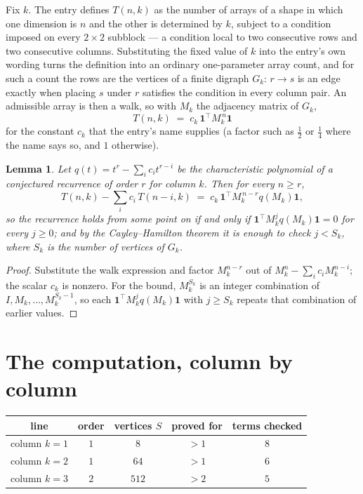 \documentclass[11pt,a4paper]{article}
\theoremstyle{plain}
\newtheorem{lemma}[theorem]{Lemma}
\theoremstyle{definition}
\begin{document}
Fix $k$. The entry defines $T(n,k)$ as the number of arrays of a shape in which one dimension
is $n$ and the other is determined by $k$, subject to a condition imposed on every
$2\times2$ subblock --- a condition local to two consecutive rows and two consecutive columns.
Substituting the fixed value of $k$ into the entry's own wording turns the definition into an
ordinary one-parameter array count, and for such a count the rows are the vertices of a finite
digraph $G_k$: $r\to s$ is an edge exactly when placing $s$ under $r$ satisfies the condition
in every column pair. An admissible array is then a walk, so with $M_k$ the adjacency matrix
of $G_k$,
\[
T(n,k)\;=\;c_k\,\mathbf{1}^{\!\top}M_k^{\,n}\mathbf{1}
\]
for the constant $c_k$ that the entry's name supplies (a factor such as $\tfrac12$ or
$\tfrac14$ where the name says so, and $1$ otherwise).

\begin{lemma}\label{lem:crit}
Let $q(t)=t^{r}-\sum_i c_it^{r-i}$ be the characteristic polynomial of a conjectured
recurrence of order $r$ for column $k$. Then for every $n\ge r$,
\[
T(n,k)-\sum_i c_i\,T(n-i,k)\;=\;c_k\,\mathbf{1}^{\!\top}M_k^{\,n-r}q(M_k)\mathbf{1},
\]
so the recurrence holds from some point on if and only if
$\mathbf{1}^{\!\top}M_k^{j}q(M_k)\mathbf{1}=0$ for every $j\ge0$; and by the
Cayley--Hamilton theorem it is enough to check $j<S_k$, where $S_k$ is the number of vertices
of $G_k$.
\end{lemma}

\begin{proof}
Substitute the walk expression and factor $M_k^{n-r}$ out of $M_k^{n}-\sum_ic_iM_k^{n-i}$;
the scalar $c_k$ is nonzero. For the bound, $M_k^{S_k}$ is an integer combination of
$I,M_k,\dots,M_k^{S_k-1}$, so each $\mathbf{1}^{\!\top}M_k^{j}q(M_k)\mathbf{1}$ with
$j\ge S_k$ repeats that combination of earlier values.
\end{proof}

\section{The computation, column by column}

\begin{center}
\begin{tabular}{ccccc}
line & order & vertices $S$ & proved for & terms checked \\ \hline
column $k$$=1$ & $1$ & $8$ & $>1$ & $8$ \\
column $k$$=2$ & $1$ & $64$ & $>1$ & $6$ \\
column $k$$=3$ & $2$ & $512$ & $>2$ & $5$ \\
\end{tabular}
\end{center}
\end{document}
